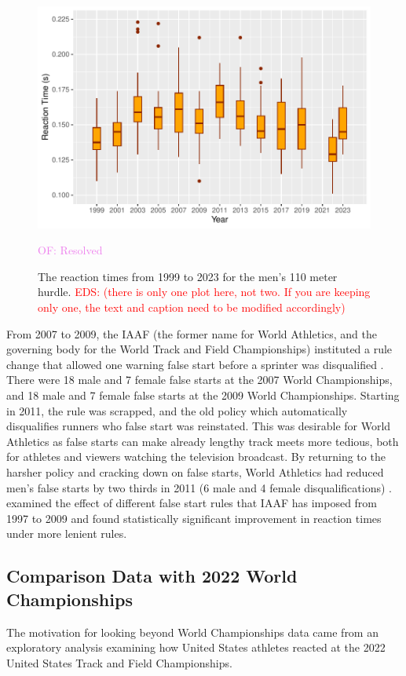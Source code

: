 \documentclass[12pt, letterpaper, titlepage]{article}
\newcommand{\eds}[1]{\textcolor{red}{EDS: (#1)}}
\newcommand{\of}[1]{\textcolor{violet}{OF: #1}}
\begin{document}
\begin{figure}[tbp]
  \centering
  \includegraphics{Boxplot}
  \caption{The reaction times from 1999 to 2023 for the men's 110 meter hurdle.
	\eds{there is only one plot here, not two. If you are keeping only one, the
	text and caption need to be modified accordingly}}
  \of{Resolved}
  \label{fig:Boxplot}
\end{figure}


From 2007 to 2009, the IAAF (the former name for World Athletics, and the 
governing body for the World Track and Field Championships) instituted a rule 
change that allowed one warning false start before a sprinter was disqualified 
\citep{iaaf2009falsestart}. There were 18 male and 7 female false starts at the 
2007 World Championships, and 18 male and 7 female false starts at the 2009 World 
Championships. Starting in 2011, the rule was scrapped, and the old policy which
automatically disqualifies runners who false start was reinstated. This was 
desirable for World Athletics as false starts can make already lengthy track 
meets more tedious, both for athletes and viewers watching the television 
broadcast. By returning to the harsher policy and cracking down on false starts,
World Athletics had reduced men's false starts by two thirds in 2011 (6 male and
4 female disqualifications) \citep{iaaf2009falsestart}. \citet{haugen2013effect}
examined the effect of different false start rules that IAAF has imposed from 
1997 to 2009 and found statistically significant improvement in reaction times 
under more lenient rules.


\subsection{Comparison Data with 2022 World Championships}\label{sec:databeyond}
The motivation for looking beyond World Championships data came from an 
exploratory analysis examining how United States athletes reacted at the 
2022 United States Track and Field Championships.
\end{document}
